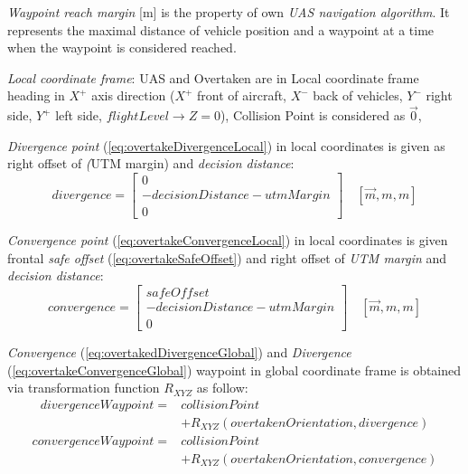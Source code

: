 \begin{note}
    \emph{Waypoint reach margin} [m] is the property of own \emph{UAS navigation algorithm}. It represents the maximal distance of vehicle position and a waypoint at a time when the waypoint is considered reached. 
\end{note}

\noindent \emph{Local coordinate frame}: UAS and Overtaken are in Local coordinate frame heading in $X^+$ axis direction ($X^+$ front of aircraft, $X^-$ back of vehicles, $Y^-$ right side, $Y^+$ left side, $flightLevel\to Z=0$), Collision Point is considered as $\vec{0}$,

\emph{Divergence point} (\ref{eq:overtakeDivergenceLocal}) in local coordinates is given as right offset of \emph(UTM margin) and \emph{decision distance}:
\begin{equation}\label{eq:overtakeDivergenceLocal}
    divergence= 
    \begin{bmatrix}
        0\\
        -decisionDistance - utmMargin\\
        0
    \end{bmatrix}
    \quad [\vec{m},m,m]
\end{equation}

\emph{Convergence point} (\ref{eq:overtakeConvergenceLocal}) in local coordinates is given frontal \emph{safe offset} (\ref{eq:overtakeSafeOffset}) and right offset of \emph{UTM margin} and \emph{decision distance}:
\begin{equation}\label{eq:overtakeConvergenceLocal}
    convergence= 
    \begin{bmatrix}
        safeOffset\\
        -decisionDistance - utmMargin\\
        0
    \end{bmatrix}
    \quad [\vec{m},m,m]
\end{equation}

\emph{Convergence} (\ref{eq:overtakedDivergenceGlobal}) and \emph{Divergence} (\ref{eq:overtakeConvergenceGlobal}) waypoint in global coordinate frame is obtained via transformation function $R_{XYZ}$ as follow:
\begin{equation}\label{eq:overtakedDivergenceGlobal}
    \begin{split}
        divergenceWaypoint = & collisionPoint \\ &+ R_{XYZ}(overtakenOrientation,divergence)    
    \end{split}
\end{equation}
\begin{equation}\label{eq:overtakeConvergenceGlobal}
    \begin{split}
        convergenceWaypoint =  & collisionPoint \\ &+ R_{XYZ}(overtakenOrientation,convergence) 
    \end{split}
\end{equation}

